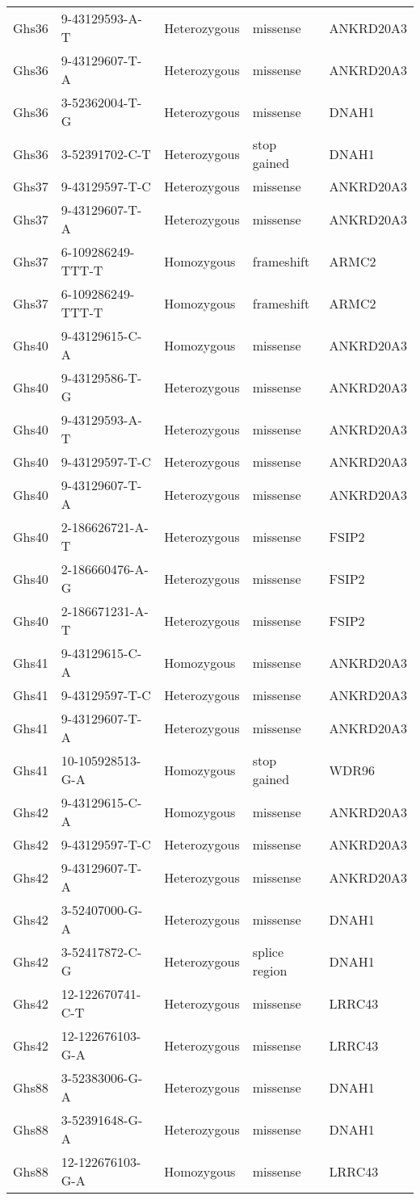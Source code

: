 \documentclass[12pt,twoside]{reedthesis}
\theoremstyle{definition}
\theoremstyle{definition}
\theoremstyle{remark}
\begin{document}
\begin{longtable}[t]{lllll}
  Ghs36 & 9-43129593-A-T & Heterozygous & missense & ANKRD20A3\\
  Ghs36 & 9-43129607-T-A & Heterozygous & missense & ANKRD20A3\\
  Ghs36 & 3-52362004-T-G & Heterozygous & missense & DNAH1\\
  Ghs36 & 3-52391702-C-T & Heterozygous & stop gained & DNAH1\\
  \addlinespace
  Ghs37 & 9-43129597-T-C & Heterozygous & missense & ANKRD20A3\\
  Ghs37 & 9-43129607-T-A & Heterozygous & missense & ANKRD20A3\\
  Ghs37 & 6-109286249-TTT-T & Homozygous & frameshift & ARMC2\\
  Ghs37 & 6-109286249-TTT-T & Homozygous & frameshift & ARMC2\\
  Ghs40 & 9-43129615-C-A & Homozygous & missense & ANKRD20A3\\
  \addlinespace
  Ghs40 & 9-43129586-T-G & Heterozygous & missense & ANKRD20A3\\
  Ghs40 & 9-43129593-A-T & Heterozygous & missense & ANKRD20A3\\
  Ghs40 & 9-43129597-T-C & Heterozygous & missense & ANKRD20A3\\
  Ghs40 & 9-43129607-T-A & Heterozygous & missense & ANKRD20A3\\
  Ghs40 & 2-186626721-A-T & Heterozygous & missense & FSIP2\\
  \addlinespace
  Ghs40 & 2-186660476-A-G & Heterozygous & missense & FSIP2\\
  Ghs40 & 2-186671231-A-T & Heterozygous & missense & FSIP2\\
  Ghs41 & 9-43129615-C-A & Homozygous & missense & ANKRD20A3\\
  Ghs41 & 9-43129597-T-C & Heterozygous & missense & ANKRD20A3\\
  Ghs41 & 9-43129607-T-A & Heterozygous & missense & ANKRD20A3\\
  \addlinespace
  Ghs41 & 10-105928513-G-A & Homozygous & stop gained & WDR96\\
  Ghs42 & 9-43129615-C-A & Homozygous & missense & ANKRD20A3\\
  Ghs42 & 9-43129597-T-C & Heterozygous & missense & ANKRD20A3\\
  Ghs42 & 9-43129607-T-A & Heterozygous & missense & ANKRD20A3\\
  Ghs42 & 3-52407000-G-A & Heterozygous & missense & DNAH1\\
  \addlinespace
  Ghs42 & 3-52417872-C-G & Heterozygous & splice region & DNAH1\\
  Ghs42 & 12-122670741-C-T & Heterozygous & missense & LRRC43\\
  Ghs42 & 12-122676103-G-A & Heterozygous & missense & LRRC43\\
  Ghs88 & 3-52383006-G-A & Heterozygous & missense & DNAH1\\
  Ghs88 & 3-52391648-G-A & Heterozygous & missense & DNAH1\\
  Ghs88 & 12-122676103-G-A & Homozygous & missense & LRRC43\\
  \bottomrule
  \end{longtable}
  
\end{document}
